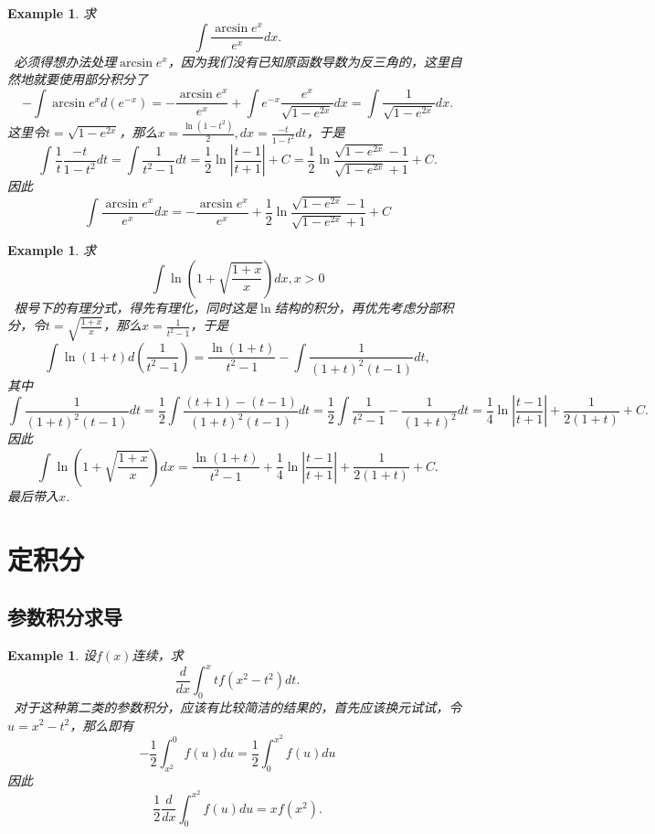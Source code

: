 \documentclass{article}
\newtheorem{example}[theorem]{Example}
\newcommand{\hints}{{\color{blue} \text{hints}}}
\begin{document}
\begin{example}
\rm 求
$$
\int \frac{\arcsin e^x}{e^x}dx. 
$$
\hints\ 必须得想办法处理$\arcsin e^x$，因为我们没有已知原函数导数为反三角的，这里自然地就要使用部分积分了
$$
-\int \arcsin e^x d(e^{-x}) = -\frac{\arcsin e^x}{e^x} + \int e^{-x} \frac{e^x}{\sqrt{1-e^{2x}}}dx = \int \frac{1}{\sqrt{1-e^{2x}}}dx . 
$$
这里令$t=\sqrt{1-e^{2x}}$，那么$x = \frac{\ln(1-t^2)}{2},dx = \frac{-t}{1-t^2}dt$，于是
$$
\int \frac{1}{t} \frac{-t}{1-t^2}dt = \int\frac{1}{t^2-1}dt =  \frac{1}{2}\ln \left| \frac{t-1}{t+1} \right| + C = \frac{1}{2}\ln  \frac{\sqrt{1-e^{2x}}-1}{\sqrt{1-e^{2x}}+1}  + C.  
$$
因此
$$
\int \frac{\arcsin e^x}{e^x}dx = -\frac{\arcsin e^x}{e^x} + \frac{1}{2}\ln  \frac{\sqrt{1-e^{2x}}-1}{\sqrt{1-e^{2x}}+1}  + C  
$$
\end{example}

\begin{example}
\rm 求
$$
\int \ln\left( 1+\sqrt{\frac{1+x}{x}} \right)dx, x>0
$$
\hints\ 根号下的有理分式，得先有理化，同时这是$\ln$结构的积分，再优先考虑分部积分，令$t = \sqrt{\frac{1+x}{x}}$，那么$x =\frac{1}{t^2-1}$，于是
$$
\int \ln(1+t)d\left(\frac{1}{t^2-1}\right) = \frac{\ln(1+t)}{{t^2-1}}- \int \frac{1}{(1+t)^2(t-1)}dt,
$$
其中
$$
\int \frac{1}{(1+t)^2(t-1)}dt = \frac{1}{2}\int \frac{(t+1)-(t-1)}{(1+t)^2(t-1)}dt = \frac{1}{2} \int \frac{1}{t^2-1} - \frac{1}{(1+t)^2}dt = \frac{1}{4}\ln\left|\frac{t-1}{t+1} \right| + \frac{1}{2(1+t)} + C. 
$$
因此
$$
\int \ln\left( 1+\sqrt{\frac{1+x}{x}} \right)dx = \frac{\ln(1+t)}{{t^2-1}} + \frac{1}{4}\ln\left|\frac{t-1}{t+1} \right| + \frac{1}{2(1+t)} + C. 
$$
最后带入$x$. 
\end{example}

\newpage
\section{定积分}



\subsection{参数积分求导}

\begin{example}
\rm 设$f(x)$连续，求
$$
\frac{d}{dx}\int_0^x tf(x^2-t^2)dt.
$$
\hints\ 对于这种第二类的参数积分，应该有比较简洁的结果的，首先应该换元试试，令$u = x^2 - t^2$，那么即有
$$
-\frac{1}{2}\int_{x^2}^{0} f(u)du = \frac{1}{2}\int_{0}^{x^2} f(u)du 
$$
因此
$$
\frac{1}{2}\frac{d}{dx}\int_{0}^{x^2} f(u)du = xf(x^2). 
$$
\end{example}
\end{document}
